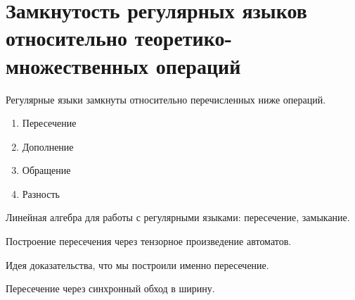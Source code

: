 \section{Замкнутость регулярных языков относительно теоретико-множественных операций}

\begin{theorem}
    Регулярные языки замкнуты относительно перечисленных ниже операций.
    \begin{enumerate}
        \item Пересечение
        \item Дополнение
        \item Обращение
        \item Разность
    \end{enumerate}
\end{theorem}

Линейная алгебра для работы с регулярными языками: пересечение, замыкание.

Построение пересечения через тензорное произведение автоматов.

Идея доказательства, что мы построили именно пересечение.

Пересечение через синхронный обход в ширину.

%
%
